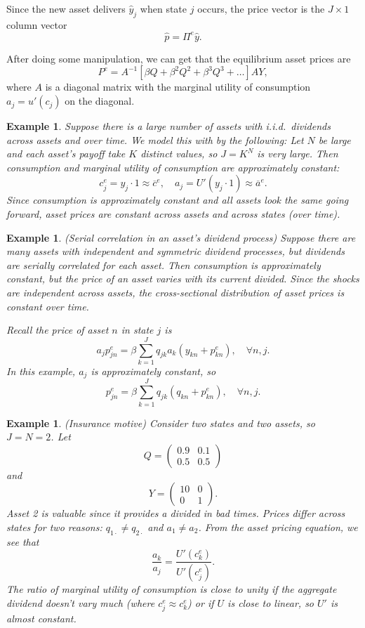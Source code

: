 \documentclass{tufte-handout}
\newtheorem{ex}[thm]{Example}
\theoremstyle{definition}
\begin{document}
Since the new asset delivers $\hat{y}_j$ when state $j$ occurs, the price vector is the $J\times 1$ column vector \[
	\hat{p} = \Pi^{e} \hat{y}
.\] 

After doing some manipulation, we can get that the equilibrium asset prices are \[
	P^e = A^{-1}\left[ \beta Q + \beta^2Q^2 + \beta^3Q^3+\ldots \right]AY
,\] where $A$ is a diagonal matrix with the marginal utility of consumption $a_j = u'(c_j)$ on the diagonal. 

\begin{ex}
	Suppose there is a large number of assets with i.i.d.\ dividends across assets and over time.
	We model this with by the following:
	Let $N$ be large and each asset's payoff take $K$ distinct values, so $J = K^{N}$ is very large. 
	Then consumption and marginal utility of consumption are approximately constant: \[
		c_j^e = y_j \cdot 1 \approx \overline{c}^{e}, \quad a_j = U'(y_j \cdot 1) \approx \overline{a}^e
	.\] Since consumption is approximately constant and all assets look the same going forward, asset prices are constant across assets and across states (over time).
\end{ex}

\begin{ex}
	(Serial correlation in an asset's dividend process) Suppose there are many assets with independent and symmetric dividend processes, but dividends are serially correlated for each asset. Then consumption is approximately constant, but the price of an asset varies with its current divided. Since the shocks are independent across assets, the cross-sectional distribution of asset prices is constant over time.

	Recall the price of asset $n$ in state $j$ is \[
		a_j p_{jn}^{e} = \beta \sum\limits_{k=1}^{J} q_{jk}a_k (y_{kn} + p_{kn}^{e}), \quad \forall n,j
	.\] 
	In this example, $a_j$ is approximately constant, so \[
		p_{jn}^{e} = \beta \sum\limits_{k=1}^{J} q_{jk} \left( q_{kn} + p_{kn}^{e} \right), \quad \forall n,j
	.\] 
\end{ex}

\begin{ex}
	(Insurance motive) Consider two states and two assets, so $J=N= 2$. Let \[
		Q = \begin{pmatrix}
		0.9 & 0.1 \\
		0.5 & 0.5
		\end{pmatrix} 
	\] and \[
		Y = \begin{pmatrix}
		10 & 0 \\
		0 & 1
	\end{pmatrix} 
	.\] Asset 2 is valuable since it provides a divided in bad times. Prices differ across states for two reasons: $q_{1\cdot } \ne q_{2\cdot }$ and $a_1 \ne a_2$. From the asset pricing equation, we see that \[
		\frac{a_k}{a_j} = \frac{U'(c_k^{e})}{U'(c_j^{e})}
	.\] The ratio of marginal utility of consumption is close to unity if the aggregate dividend doesn't vary much (where $c_j^{e} \approx c_k^{e}$) or if $U$ is close to linear, so $U'$ is almost constant.
\end{ex}
\end{document}
